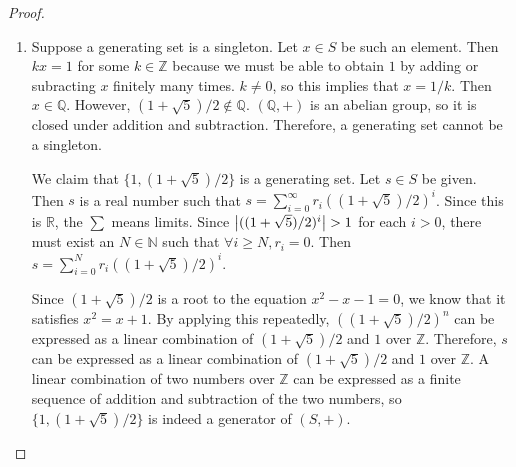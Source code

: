 \documentclass[12pt, psamsfonts]{amsart}
\theoremstyle{definition}
\theoremstyle{remark}
\numberwithin{equation}{section}
\begin{document}
\begin{proof}
  $ $
  \begin{enumerate}
    \item 
      Suppose a generating set is a singleton.
      Let $x \in S$ be such an element.
      Then $kx = 1$ for some $k \in \mathbb{Z}$ because we must be able to obtain $1$ by adding or subracting $x$ finitely many times.
      $k \ne 0$, so this implies that $x = 1 / k$.
      Then $x \in \mathbb{Q}$.
      However, $(1 + \sqrt{5}) / 2 \notin \mathbb{Q}$.
      $(\mathbb{Q}, +)$ is an abelian group, so it is closed under addition and subtraction.
      Therefore, a generating set cannot be a singleton.

      We claim that $\{ 1, (1 + \sqrt{5}) / 2 \}$ is a generating set.
      Let $s \in S$ be given.
      Then $s$ is a real number such that $s = \sum_{i=0}^{\infty} r_i((1 + \sqrt{5}) / 2)^i$.
      Since this is $\mathbb{R}$, the $\sum$ means limits.
      Since $\abs{((1 + \sqrt{5}) / 2)^i} > 1$ for each $i > 0$, there must exist an $N \in \mathbb{N}$ such that $\forall i \geq N, r_i = 0$.
      Then $s = \sum_{i=0}^{N} r_i((1 + \sqrt{5}) / 2)^i$.

      Since $(1 + \sqrt{5}) / 2$ is a root to the equation $x^2 - x - 1 = 0$, we know that it satisfies $x^2 = x + 1$.
      By applying this repeatedly, $((1 + \sqrt{5}) / 2)^n$ can be expressed as a linear combination of $(1 + \sqrt{5}) / 2$ and $1$ over $\mathbb{Z}$.
      Therefore, $s$ can be expressed as a linear combination of $(1 + \sqrt{5}) / 2$ and $1$ over $\mathbb{Z}$.
      A linear combination of two numbers over $\mathbb{Z}$ can be expressed as a finite sequence of addition and subtraction of the two numbers, so $\{ 1, (1 + \sqrt{5}) / 2 \}$ is indeed a generator of $(S, +)$.
  \end{enumerate}
\end{proof}
\end{document}
